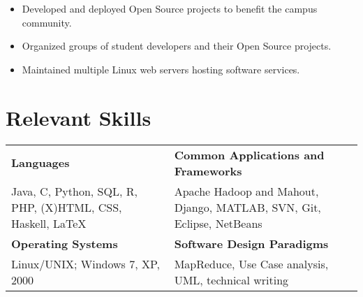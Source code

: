 \documentclass[letterpaper]{article}
\newenvironment{details}
{\begin{itemize}}
{\end{itemize}}
\begin{document}
  \begin{details}
  \item Developed and deployed Open Source projects to benefit the campus community.
  \item Organized groups of student developers and their Open Source projects.
  \item Maintained multiple Linux web servers hosting software services.
  \end{details}


  \section{Relevant Skills}
  \noindent
  \begin{tabularx}{\textwidth}{@{}X X@{}}
    \textbf{Languages}                                          &  \textbf{Common Applications and Frameworks} \\
    Java, C, Python, SQL, R, PHP, (X)HTML, CSS, Haskell, \LaTeX &  Apache Hadoop and Mahout, Django, MATLAB, SVN, Git, Eclipse, NetBeans \\[0.2cm]
    \textbf{Operating Systems}                                  &  \textbf{Software Design Paradigms} \\
    Linux/UNIX; Windows 7, XP, 2000                             &  MapReduce, Use Case analysis, UML, technical writing
  \end{tabularx}


\end{document}
